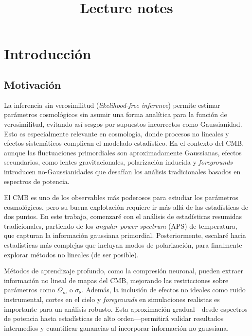 \documentclass[11pt]{article}
\title{Lecture notes}
\author{}
\date{}
\begin{document}
\setlength{\parindent}{0pt}
\setlength{\parskip}{1ex}

\maketitle

\tableofcontents

\newpage


\clearpage

\section{Introducción}
\subsection{Motivación}
La inferencia sin verosimilitud (\textit{likelihood-free inference}) permite estimar parámetros cosmológicos sin asumir una forma analítica para la función de verosimilitud, evitando así sesgos por supuestos incorrectos como Gaussianidad. Esto es especialmente relevante en cosmología, donde procesos no lineales y efectos sistemáticos complican el modelado estadístico. En el contexto del CMB, aunque las fluctuaciones primordiales son aproximadamente Gaussianas, efectos secundarios, como lentes gravitacionales, polarización inducida y \textit{foregrounds} introducen no-Gaussianidades que desafían los análisis tradicionales basados en espectros de potencia.

El CMB es uno de los observables más poderosos para estudiar los parámetros cosmológicos, pero su buena explotación requiere ir más allá de las estadísticas de dos puntos. En este trabajo, comenzaré con el análisis de estadísticas resumidas tradicionales, partiendo de los \textit{angular power spectrum} (APS) de temperatura, que capturan la información gaussiana primordial. Posteriormente, escalaré hacia estadísticas más complejas que incluyan modos de polarización, para finalmente explorar métodos no lineales (de ser posible).

Métodos de aprendizaje profundo, como la compresión neuronal, pueden extraer información no lineal de mapas del CMB, mejorando las restricciones sobre parámetros como $\Omega_m$ o $\sigma_8$. Además, la inclusión de efectos no ideales como ruido instrumental, cortes en el cielo y \textit{foregrounds} en simulaciones realistas es importante para un análisis robusto. Esta aproximación gradual---desde espectros de potencia hasta estadísticas de alto orden---permitirá validar resultados intermedios y cuantificar ganancias al incorporar información no gaussiana.
\end{document}

